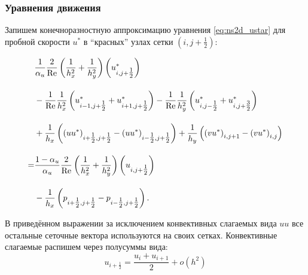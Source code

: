 \subsubsection{Уравнения движения}

Запишем конечноразностную аппроксимацию уравнения \eqref{eq:ns2d_ustar} для пробной скорости $u^*$ в ``красных'' узлах сетки
$\left(i, j+\tfrac12\right)$:

\begin{align}
    \label{eq:ns2d_ustar_discr}
       &\frac{1}{\alpha_u}\frac{2}{\mathrm{Re}}\left(\frac{1}{h_x^2} + \frac{1}{h_y^2}\right)
          \left(u^*_{i,j+\tfrac12}\right)   \\[10pt]
    \nonumber
       &-\frac{1}{\mathrm{Re}}\frac{1}{h_x^2}
          \left(
            u^*_{i-1,j+\tfrac12} + u^*_{i+1,j+\tfrac12}
          \right)
       -\frac{1}{\mathrm{Re}}\frac{1}{h_y^2}
          \left(
            u^*_{i,j-\tfrac12} + u^*_{i,j+\tfrac32}
          \right)   \\[10pt]
    \nonumber
       &+\frac{1}{h_x}
          \left(
            \left(u u^*\right)_{i+\tfrac12,j+\tfrac12}-
            \left(u u^*\right)_{i-\tfrac12,j+\tfrac12}
          \right)
        +\frac{1}{h_y}
          \left(
            \left(v u^*\right)_{i,j+1}-
            \left(v u^*\right)_{i,j}
          \right)   \\[10pt]
    \nonumber
       =&\frac{1-\alpha_u}{\alpha_u}\frac{2}{\mathrm{Re}}\left(\frac{1}{h_x^2} + \frac{1}{h_y^2}\right)
          \left(u_{i,j+\tfrac12}\right)   \\[10pt]
    \nonumber
       &-\frac{1}{h_x}\left(p_{i+\tfrac12,j+\tfrac12} - p_{i-\tfrac12,j+\tfrac12}\right).
\end{align}

В приведённом выражении
за исключением конвективных слагаемых вида $u u$ все остальные
сеточные вектора используются на своих сетках.
Конвективные слагаемые распишем через полусуммы вида:
\begin{equation*}
    u_{i+\tfrac12} = \frac{u_{i} + u_{i+1}}{2} + o(h^2)
\end{equation*}

